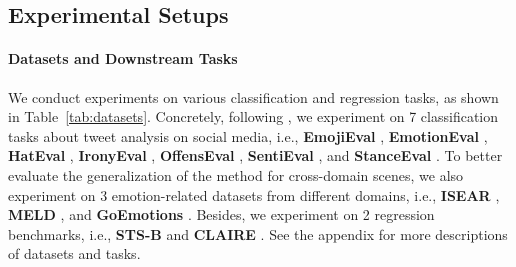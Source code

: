 \documentclass[letterpaper]{article} %
\begin{document}
\subsection{Experimental Setups}

\paragraph{Datasets and Downstream Tasks}
We conduct experiments on various classification and regression tasks, as shown in Table~\ref{tab:datasets}.
Concretely, following \citet{DBLP:conf/emnlp/BarbieriCAN20}, we experiment on 7 classification tasks about tweet analysis on social media, i.e., 
\textbf{EmojiEval} \cite{DBLP:conf/semeval/BarbieriCRABBPS18},
\textbf{EmotionEval} \cite{DBLP:conf/semeval/MohammadBSK18},
\textbf{HatEval} \cite{DBLP:conf/semeval/BasileBFNPPRS19}, 
\textbf{IronyEval} \cite{DBLP:conf/semeval/HeeLH18},
\textbf{OffensEval} \cite{DBLP:conf/semeval/ZampieriMNRFK19},
\textbf{SentiEval} \cite{DBLP:conf/semeval/RosenthalRNS14},
and \textbf{StanceEval} \cite{DBLP:conf/semeval/MohammadKSZC16}.
To better evaluate the generalization of the method for cross-domain scenes, we also experiment on 3 emotion-related datasets from different domains, i.e., \textbf{ISEAR} \cite{scherer1994evidence},
\textbf{MELD} \cite{DBLP:conf/acl/PoriaHMNCM19},
and 
\textbf{GoEmotions} \cite{DBLP:conf/acl/DemszkyMKCNR20}. 
Besides, we experiment on 2 regression benchmarks, i.e., \textbf{STS-B} \cite{DBLP:conf/semeval/CerDALS17} and \textbf{CLAIRE} \cite{DBLP:conf/semeval/RothAS22}.
See the appendix for more descriptions of datasets and tasks.
\end{document}
